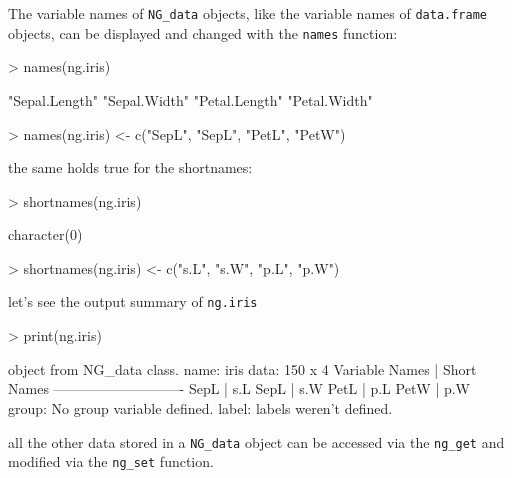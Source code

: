 \documentclass[12pt,oneside,titlepage,letter]{article}
\begin{document}
The variable names of \texttt{NG\_data} objects, like the variable names of \texttt{data.frame} objects, can be displayed and changed with the \texttt{names} function:

\begin{Schunk}
\begin{Sinput}
> names(ng.iris)
\end{Sinput}
\begin{Soutput}
[1] "Sepal.Length" "Sepal.Width"  "Petal.Length" "Petal.Width" 
\end{Soutput}
\begin{Sinput}
> names(ng.iris) <- c("SepL", "SepL", "PetL", "PetW")
\end{Sinput}
\end{Schunk}

the same holds true for the shortnames:

\begin{Schunk}
\begin{Sinput}
> shortnames(ng.iris)
\end{Sinput}
\begin{Soutput}
character(0)
\end{Soutput}
\begin{Sinput}
> shortnames(ng.iris) <- c("s.L", "s.W", "p.L", "p.W")
\end{Sinput}
\end{Schunk}

let's see the output summary of \texttt{ng.iris}

\begin{Schunk}
\begin{Sinput}
> print(ng.iris)
\end{Sinput}
\begin{Soutput}
object from NG_data class.
  name: iris 
  data: 150 x 4 
    Variable Names | Short Names
    ----------------------------
    SepL           | s.L
    SepL           | s.W
    PetL           | p.L
    PetW           | p.W
  group:  No group variable defined.
  label: labels weren't defined.
\end{Soutput}
\end{Schunk}

all the other data stored in a \texttt{NG\_data} object can be accessed via the \texttt{ng\_get} and modified via the \texttt{ng\_set} function.
\end{document}
